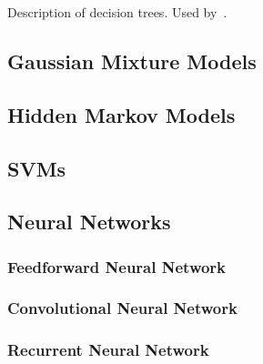Description of decision trees. Used by~\cite{acevedo2009automated}.

\subsection{Gaussian Mixture Models}

\subsection{Hidden Markov Models}

\subsection{SVMs}

\subsection{Neural Networks}

\subsubsection{Feedforward Neural Network}

\subsubsection{Convolutional Neural Network}

\subsubsection{Recurrent Neural Network}
